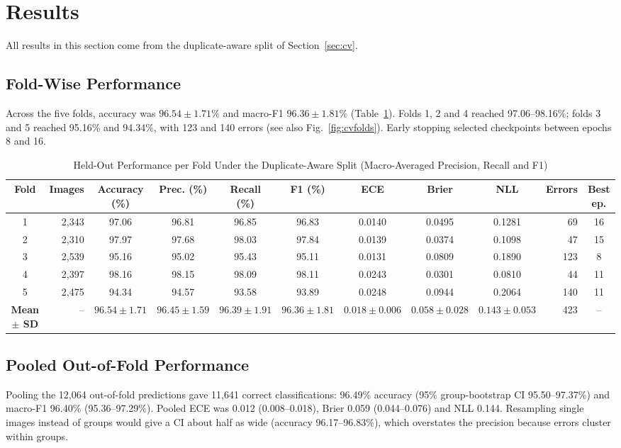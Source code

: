 \documentclass[journal,onecolumn]{IEEEtran}
\begin{document}
\section{Results}\label{sec:results}
All results in this section come from the duplicate-aware split of Section~\ref{sec:cv}.

\subsection{Fold-Wise Performance}
Across the five folds, accuracy was $96.54 \pm 1.71\%$ and macro-F1 $96.36 \pm 1.81\%$ (Table~\ref{tab:folds}). Folds 1, 2 and 4 reached 97.06--98.16\%; folds 3 and 5 reached 95.16\% and 94.34\%, with 123 and 140 errors (see also Fig.~\ref{fig:cvfolds}). Early stopping selected checkpoints between epochs 8 and 16.

\begin{table}[!t]
\caption{Held-Out Performance per Fold Under the Duplicate-Aware Split (Macro-Averaged Precision, Recall and F1)}
\label{tab:folds}
\centering
\footnotesize
\setlength{\tabcolsep}{2.1pt}
\begin{tabular}{@{}crcccccccrc@{}}
\toprule
Fold & Images & Accuracy (\%) & Prec. (\%) & Recall (\%) & F1 (\%) & ECE & Brier & NLL & Errors & Best ep. \\
\midrule
1 & 2,343 & 97.06 & 96.81 & 96.85 & 96.83 & 0.0140 & 0.0495 & 0.1281 & 69 & 16 \\
2 & 2,310 & 97.97 & 97.68 & 98.03 & 97.84 & 0.0139 & 0.0374 & 0.1098 & 47 & 15 \\
3 & 2,539 & 95.16 & 95.02 & 95.43 & 95.11 & 0.0131 & 0.0809 & 0.1890 & 123 & 8 \\
4 & 2,397 & 98.16 & 98.15 & 98.09 & 98.11 & 0.0243 & 0.0301 & 0.0810 & 44 & 11 \\
5 & 2,475 & 94.34 & 94.57 & 93.58 & 93.89 & 0.0248 & 0.0944 & 0.2064 & 140 & 11 \\
\midrule
\textbf{Mean $\pm$ SD} & -- & $\mathbf{96.54 \pm 1.71}$ & $\mathbf{96.45 \pm 1.59}$ & $\mathbf{96.39 \pm 1.91}$ & $\mathbf{96.36 \pm 1.81}$ & $\mathbf{0.018 \pm 0.006}$ & $\mathbf{0.058 \pm 0.028}$ & $\mathbf{0.143 \pm 0.053}$ & 423 & -- \\
\bottomrule
\end{tabular}
\end{table}

\subsection{Pooled Out-of-Fold Performance}
Pooling the 12,064 out-of-fold predictions gave 11,641 correct classifications: 96.49\% accuracy (95\% group-bootstrap CI 95.50--97.37\%) and macro-F1 96.40\% (95.36--97.29\%). Pooled ECE was 0.012 (0.008--0.018), Brier 0.059 (0.044--0.076) and NLL 0.144. Resampling single images instead of groups would give a CI about half as wide (accuracy 96.17--96.83\%), which overstates the precision because errors cluster within groups.
\end{document}

